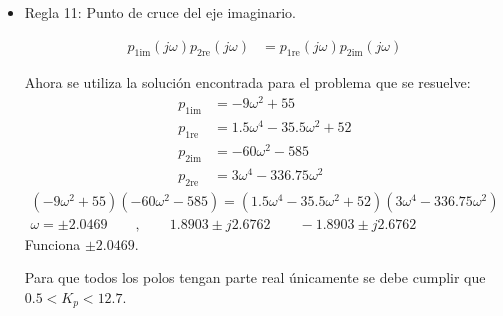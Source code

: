 \begin{itemize}
  \item Regla 11: Punto de cruce del eje imaginario.

  \begin{align*}
    p_{1\text{im}}(j\omega) p_{2\text{re}}(j\omega) &=  p_{1\text{re}}(j\omega) p_{2\text{im}}(j\omega)
  \end{align*}

  Ahora se utiliza la solución encontrada para el problema que se resuelve:
  \begin{align*}
    p_{1\text{im}} &=-9\omega^2+55
    \\
    p_{1\text{re}} &=1.5\omega^4-35.5\omega^2+52
    \\
    p_{2\text{im}} &=-60\omega^2 -585
    \\
    p_{2\text{re}} &=3\omega^4 - 336.75 \omega^2
  \end{align*}
  \begin{align*}
    (-9\omega^2+55)(-60\omega^2 -585) = (1.5\omega^4-35.5\omega^2+52)(3\omega^4 - 336.75 \omega^2)
    \\
    \omega = \pm 2.0469 \qquad, \qquad 1.8903 \pm j2.6762 \qquad -1.8903 \pm j2.6762
  \end{align*}
  Funciona $\pm2.0469$.

  Para que todos los polos tengan parte real únicamente se debe cumplir que $0.5<K_p<12.7$.

\end{itemize}
